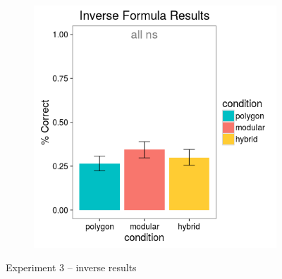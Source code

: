 \documentclass[man,mask,10pt]{apa6}
\begin{document}
\begin{figure}[H]
\begin{subfigure}[c]{0.3\textwidth}
\end{subfigure}
~
\begin{subfigure}[c]{0.3\textwidth}
\centering
\includegraphics[width=\textwidth]{figures/3/in_f_r.png}
\end{subfigure}
\caption{Experiment 3 -- inverse results}
\label{ex3_in}
\end{figure} 
\end{document}

